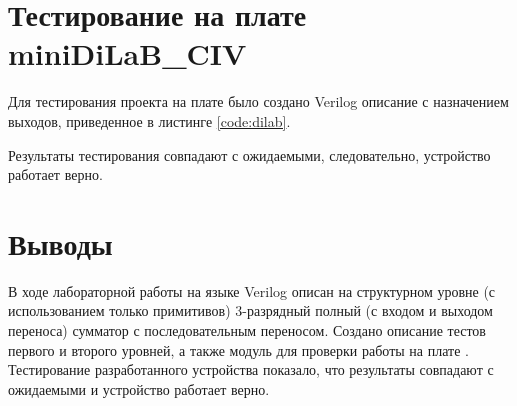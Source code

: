 \section{Тестирование на плате miniDiLaB\_CIV}

Для тестирования проекта на плате было создано Verilog описание с назначением выходов, приведенное в листинге  \ref{code:dilab}.


Результаты тестирования совпадают с ожидаемыми, следовательно, устройство работает верно.

\section{Выводы}

В ходе лабораторной работы на языке Verilog описан на структурном уровне (с использованием только примитивов) $3$-разрядный полный (с входом и выходом переноса) сумматор с последовательным переносом. Создано описание тестов первого и второго уровней, а также модуль для проверки работы на плате . Тестирование разработанного устройства показало, что результаты совпадают с ожидаемыми и устройство работает верно.

